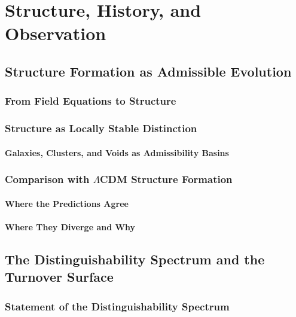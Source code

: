\documentclass[12pt,a4paper,twoside,openright]{book}
\theoremstyle{plain}
\theoremstyle{definition}
\theoremstyle{remark}
\begin{document}
\part{Structure, History, and Observation}

\chapter{Structure Formation as Admissible Evolution}
\label{ch:structure-formation}

\section{From Field Equations to Structure}

\section{Structure as Locally Stable Distinction}

\subsection{Galaxies, Clusters, and Voids as Admissibility Basins}

\section{Comparison with \texorpdfstring{$\Lambda$}{Lambda}CDM Structure Formation}

\subsection{Where the Predictions Agree}
\subsection{Where They Diverge and Why}


\chapter{The Distinguishability Spectrum and the Turnover Surface}
\label{ch:distinguishability-spectrum}


\section{Statement of the Distinguishability Spectrum}
\end{document}
